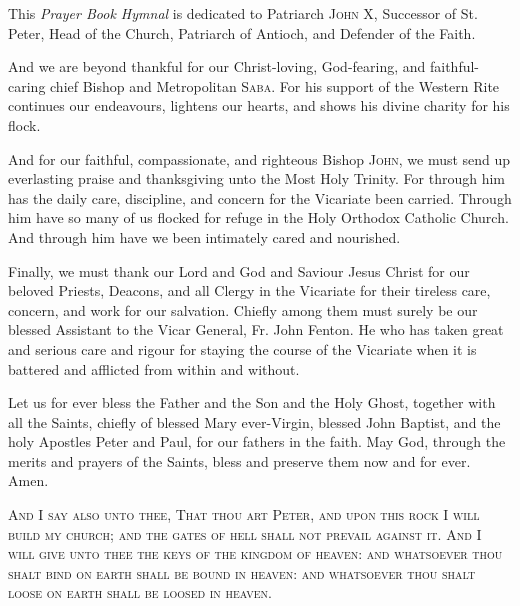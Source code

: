{}
\noindent
This \textit{Prayer Book Hymnal} is dedicated to Patriarch \textsc{John X},  Successor of St. Peter, Head of the Church, Patriarch of Antioch, and Defender of the Faith.\\
\par\noindent
And we are beyond thankful for our Christ-loving, God-fearing, and faithful-caring chief Bishop and Metropolitan \textsc{Saba}. For his support of the Western Rite continues our endeavours, lightens our hearts, and shows his divine charity for his flock.\\
\par\noindent
And for our faithful, compassionate, and righteous Bishop \textsc{John}, we must send up everlasting praise and thanksgiving unto the Most Holy Trinity. For through him has the daily care, discipline, and concern for the Vicariate been carried. Through him have so many of us flocked for refuge in the Holy Orthodox Catholic Church. And through him have we been intimately cared and nourished.\\
\par\noindent
Finally, we must thank our Lord and God and Saviour Jesus Christ for our beloved Priests, Deacons, and all Clergy in the Vicariate for their tireless care, concern, and work for our salvation. Chiefly among them must surely be our blessed Assistant to the Vicar General, Fr. John Fenton. He who has taken great and serious care and rigour for staying the course of the Vicariate when it is battered and afflicted from within and without.\\
\par\noindent
Let us for ever bless the Father and the Son and the Holy Ghost, together with all the Saints, chiefly of blessed Mary ever-Virgin, blessed John Baptist, and the holy Apostles Peter and Paul, for our fathers in the faith. May God, through the merits and prayers of the Saints, bless and preserve them now and for ever. Amen.
\vfill
\begin{center}
\textsc{And I say also unto thee, That thou art Peter, and upon this rock I will build my church; and the gates of hell shall not prevail against it. And I will give unto thee the keys of the kingdom of heaven: and whatsoever thou shalt bind on earth shall be bound in heaven: and whatsoever thou shalt loose on earth shall be loosed in heaven.}
\end{center}